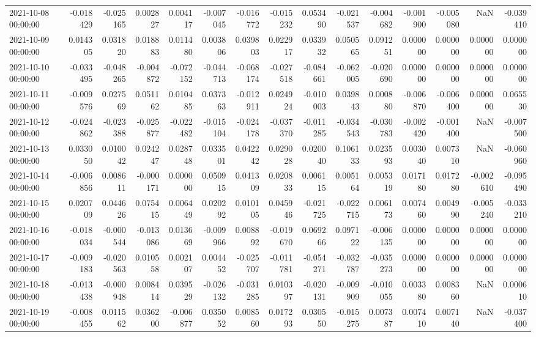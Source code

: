 \begin{tabular}{lrrrrrrrrrrrrrr}
2021-10-08 00:00:00 & -0.018429 & -0.025165 & 0.002827 & 0.004117 & -0.007045 & -0.016772 & -0.015232 & 0.053490 & -0.021537 & -0.004682 & -0.001900 & -0.005080 & NaN & -0.039410 \\
2021-10-09 00:00:00 & 0.014305 & 0.031820 & 0.018883 & 0.011480 & 0.003806 & 0.039803 & 0.022917 & 0.033932 & 0.050565 & 0.091251 & 0.000000 & 0.000000 & 0.000000 & 0.000000 \\
2021-10-10 00:00:00 & -0.033495 & -0.048265 & -0.004872 & -0.072152 & -0.044713 & -0.068174 & -0.027518 & -0.084661 & -0.062005 & -0.020690 & 0.000000 & 0.000000 & 0.000000 & 0.000000 \\
2021-10-11 00:00:00 & -0.009576 & 0.027569 & 0.051162 & 0.010485 & 0.037363 & -0.012911 & 0.024924 & -0.010003 & 0.039843 & 0.000880 & -0.006870 & -0.006400 & 0.000000 & 0.065530 \\
2021-10-12 00:00:00 & -0.024862 & -0.023388 & -0.025877 & -0.022482 & -0.015104 & -0.024178 & -0.037370 & -0.011285 & -0.034543 & -0.030783 & -0.002420 & -0.001400 & NaN & -0.007500 \\
2021-10-13 00:00:00 & 0.033050 & 0.010042 & 0.024247 & 0.028748 & 0.033501 & 0.042242 & 0.029028 & 0.020040 & 0.106133 & 0.023593 & 0.003040 & 0.007310 & NaN & -0.060960 \\
2021-10-14 00:00:00 & -0.006856 & 0.008611 & -0.000171 & 0.000000 & 0.050915 & 0.041309 & 0.020833 & 0.006115 & 0.005164 & 0.005319 & 0.017180 & 0.017280 & -0.002610 & -0.095490 \\
2021-10-15 00:00:00 & 0.020709 & 0.044626 & 0.075415 & 0.006449 & 0.020292 & 0.010105 & 0.045946 & -0.021725 & -0.022715 & 0.006173 & 0.007460 & 0.004990 & -0.005240 & -0.033210 \\
2021-10-16 00:00:00 & -0.018034 & -0.000544 & -0.013086 & 0.013669 & -0.009966 & 0.008892 & -0.019670 & 0.069266 & 0.097122 & -0.006135 & 0.000000 & 0.000000 & 0.000000 & 0.000000 \\
2021-10-17 00:00:00 & -0.009183 & -0.020563 & 0.010558 & 0.002107 & 0.004452 & -0.025707 & -0.011781 & -0.054271 & -0.032787 & -0.035273 & 0.000000 & 0.000000 & 0.000000 & 0.000000 \\
2021-10-18 00:00:00 & -0.013438 & -0.000948 & 0.008414 & 0.039529 & -0.026132 & -0.031285 & 0.010397 & -0.020131 & -0.009909 & -0.010055 & 0.003380 & 0.008360 & NaN & 0.000610 \\
2021-10-19 00:00:00 & -0.008455 & 0.011562 & 0.036200 & -0.006877 & 0.035052 & 0.008560 & 0.017293 & 0.030550 & -0.015275 & 0.007387 & 0.007410 & 0.007140 & NaN & -0.037400 \\

\end{tabular}
